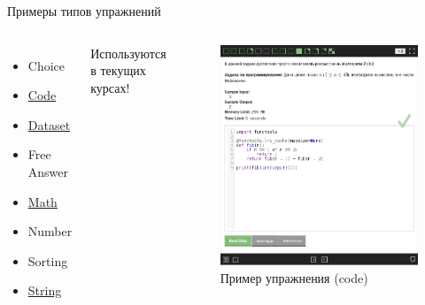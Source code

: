 \documentclass{beamer}
\begin{document}
\begin{frame}{Примеры типов упражнений}
  \begin{columns}
    \begin{itemize}
    \item Choice
    \item \underline{Code}
    \item \underline{Dataset}
    \item Free Answer
    \item \underline{Math}
    \item Number
    \item Sorting
    \item \underline{String}
    \end{itemize}
    Используются в текущих курсах!
    \begin{figure}
      \includegraphics[width=\textwidth]{../res/quiz.png}
      \caption{Пример упражнения (code)}
      \label{fig:1}
    \end{figure}
  \end{columns}
\end{frame}
\end{document}
